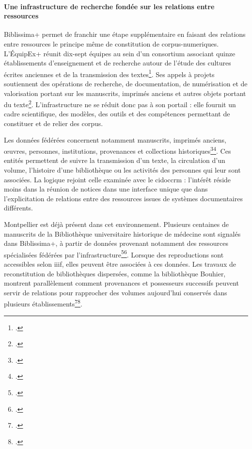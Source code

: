 \paragraph{Une infrastructure de recherche fondée sur les relations entre ressources}

Biblissima+ permet de franchir une étape supplémentaire en faisant des relations entre ressources le principe même de constitution de \glspl{corpus-numerique}. L'ÉquipEx+ réunit dix-sept équipes au sein d'un consortium associant quinze établissements d'enseignement et de recherche autour de l'étude des cultures écrites anciennes et de la transmission des textes\footcite{BiblissimaPresentation2026}. Ses appels à projets soutiennent des opérations de recherche, de documentation, de numérisation et de valorisation portant sur les manuscrits, imprimés anciens et autres objets portant du texte\footcite{BiblissimaPresentation2026}. L'infrastructure ne se réduit donc pas à son portail : elle fournit un cadre scientifique, des modèles, des outils et des compétences permettant de constituer et de relier des corpus.

Les données fédérées concernent notamment manuscrits, imprimés anciens, œuvres, personnes, institutions, provenances et collections historiques\footcite{BiblissimaSources}\footcite{TurcanVerkerk2020}. Ces entités permettent de suivre la transmission d'un texte, la circulation d'un volume, l'histoire d'une bibliothèque ou les activités des personnes qui leur sont associées. La logique rejoint celle examinée avec le \gls{cidoccrm} : l'intérêt réside moins dans la réunion de notices dans une interface unique que dans l'explicitation de relations entre des ressources issues de systèmes documentaires différents.

Montpellier est déjà présent dans cet environnement. Plusieurs centaines de manuscrits de la Bibliothèque universitaire historique de médecine sont signalés dans Biblissima+, à partir de données provenant notamment des ressources spécialisées fédérées par l'infrastructure\footcite{BiblissimaMontpellierMedecine}\footcite{BiblissimaRessources}. Lorsque des reproductions sont accessibles selon \gls{iiif}, elles peuvent être associées à ces données. Les travaux de reconstitution de bibliothèques dispersées, comme la bibliothèque Bouhier, montrent parallèlement comment provenances et possesseurs successifs peuvent servir de relations pour rapprocher des volumes aujourd'hui conservés dans plusieurs établissements\footcite{BiblissimaBouhier}\footcite{TurcanVerkerk2020}.

